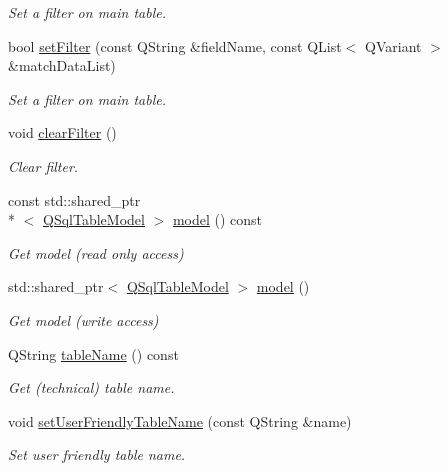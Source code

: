 \begin{DoxyCompactItemize}
\begin{DoxyCompactList}\small\item\em Set a filter on main table. \end{DoxyCompactList}\item 
bool \hyperlink{classmdt_abstract_sql_table_controller_a82ae302ef502e3982b454b0792932df0}{set\-Filter} (const Q\-String \&field\-Name, const Q\-List$<$ Q\-Variant $>$ \&match\-Data\-List)
\begin{DoxyCompactList}\small\item\em Set a filter on main table. \end{DoxyCompactList}\item 
void \hyperlink{classmdt_abstract_sql_table_controller_a22a263d8c0bb0f85fc9803f65491c436}{clear\-Filter} ()
\begin{DoxyCompactList}\small\item\em Clear filter. \end{DoxyCompactList}\item 
const std\-::shared\-\_\-ptr\\*
$<$ \hyperlink{class_q_sql_table_model}{Q\-Sql\-Table\-Model} $>$ \hyperlink{classmdt_abstract_sql_table_controller_a75eb50d92dcdce1282162cd438b136ad}{model} () const 
\begin{DoxyCompactList}\small\item\em Get model (read only access) \end{DoxyCompactList}\item 
std\-::shared\-\_\-ptr$<$ \hyperlink{class_q_sql_table_model}{Q\-Sql\-Table\-Model} $>$ \hyperlink{classmdt_abstract_sql_table_controller_a8b9b7c1931a41357d2719bd299b01762}{model} ()
\begin{DoxyCompactList}\small\item\em Get model (write access) \end{DoxyCompactList}\item 
Q\-String \hyperlink{classmdt_abstract_sql_table_controller_aaf864d069aeb74068b6daa747b740944}{table\-Name} () const 
\begin{DoxyCompactList}\small\item\em Get (technical) table name. \end{DoxyCompactList}\item 
void \hyperlink{classmdt_abstract_sql_table_controller_acb7f475a3a2d4318e49f86dbaa0dfd9a}{set\-User\-Friendly\-Table\-Name} (const Q\-String \&name)
\begin{DoxyCompactList}\small\item\em Set user friendly table name. \end{DoxyCompactList}\item 

\end{DoxyCompactItemize}
